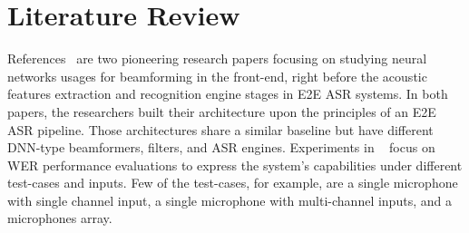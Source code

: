 \bigskip



\section{Literature Review}
References~\cite{7472778, 7952160} are 
two pioneering research papers focusing on 
studying neural networks usages
for beamforming in the front-end, right
before the acoustic features extraction and
recognition engine stages in E2E ASR systems.
In both papers, the researchers built their architecture
upon the principles of an E2E ASR pipeline.
Those architectures share a similar baseline but have different
DNN-type beamformers, filters, and ASR engines.
Experiments in ~\cite{7472778, 7952160}
focus on WER performance evaluations to express
the system's capabilities under 
different test-cases and inputs.
Few of the test-cases, for example, are a single microphone 
with single channel input,
a single microphone with multi-channel inputs,
and a microphones array.

